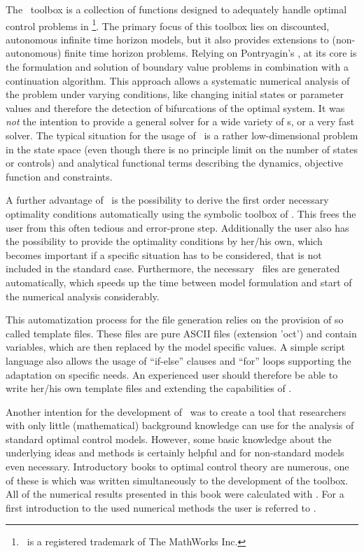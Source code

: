 The \OCT\ toolbox is a collection of functions designed to adequately handle optimal control problems in \MATL\TReg\footnote{\MATL\ is a registered trademark of The MathWorks Inc.}. The primary focus of this toolbox lies on discounted, autonomous infinite time horizon models, but it also provides extensions to (non-autonomous) finite time horizon problems. Relying on Pontryagin's \MAXP, at its core is the formulation and solution of boundary value problems in combination with a continuation algorithm. This approach allows a systematic numerical analysis of the problem under varying conditions, like changing initial states or parameter values and therefore the detection of bifurcations of the optimal system. It was \emph{not} the intention to provide a general solver for a wide variety of \OCPRO s, or a very fast solver. The typical situation for the usage of \OCMAT\ is a rather low-dimensional problem in the state space (even though there is no principle limit on the number of states or controls) and analytical functional terms describing the dynamics, objective function and constraints.  

A further advantage of \OCMAT\ is the possibility to derive the first order necessary optimality conditions automatically using the symbolic toolbox of \MATL. This frees the user from this often tedious and error-prone step. Additionally the user also has the possibility to provide the optimality conditions by her/his own, which becomes important if a specific situation has to be considered, that is not included in the standard case. Furthermore, the necessary \MATL\ files are generated automatically, which speeds up the time between model formulation and start of the numerical analysis considerably. 

This automatization process for the file generation relies on the provision of so called template files. These files are pure ASCII files (extension 'oct') and contain variables, which are then replaced by the model specific values. A simple script language also allows the usage of ``if-else'' clauses and ``for'' loops supporting the adaptation on specific needs. An experienced user should therefore be able to write her/his own template files and extending the capabilities of \OCMAT.

Another intention for the development of \OCMAT\ was to create a tool that researchers with only little (mathematical) background knowledge can use for the analysis of standard optimal control models. However, some basic knowledge about the underlying ideas and methods is certainly helpful and for non-standard models even necessary. Introductory books to optimal control theory are numerous, one of these is \cite{grassetal2008} which was written simultaneously to the development of the toolbox. All of the numerical results presented in this book were calculated with \OCMAT. For a first introduction to the used numerical methods the user is referred to \citet{grass2012}. 

